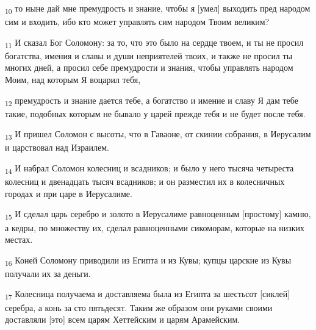 \begin{tcolorbox}
\textsubscript{10} то ныне дай мне премудрость и знание, чтобы я [умел] выходить пред народом сим и входить, ибо кто может управлять сим народом Твоим великим?
\end{tcolorbox}
\begin{tcolorbox}
\textsubscript{11} И сказал Бог Соломону: за то, что это было на сердце твоем, и ты не просил богатства, имения и славы и души неприятелей твоих, и также не просил ты многих дней, а просил себе премудрости и знания, чтобы управлять народом Моим, над которым Я воцарил тебя,
\end{tcolorbox}
\begin{tcolorbox}
\textsubscript{12} премудрость и знание дается тебе, а богатство и имение и славу Я дам тебе такие, подобных которым не бывало у царей прежде тебя и не будет после тебя.
\end{tcolorbox}
\begin{tcolorbox}
\textsubscript{13} И пришел Соломон с высоты, что в Гаваоне, от скинии собрания, в Иерусалим и царствовал над Израилем.
\end{tcolorbox}
\begin{tcolorbox}
\textsubscript{14} И набрал Соломон колесниц и всадников; и было у него тысяча четыреста колесниц и двенадцать тысяч всадников; и он разместил их в колесничных городах и при царе в Иерусалиме.
\end{tcolorbox}
\begin{tcolorbox}
\textsubscript{15} И сделал царь серебро и золото в Иерусалиме равноценным [простому] камню, а кедры, по множеству их, сделал равноценными сикоморам, которые на низких местах.
\end{tcolorbox}
\begin{tcolorbox}
\textsubscript{16} Коней Соломону приводили из Египта и из Кувы; купцы царские из Кувы получали их за деньги.
\end{tcolorbox}
\begin{tcolorbox}
\textsubscript{17} Колесница получаема и доставляема была из Египта за шестьсот [сиклей] серебра, а конь за сто пятьдесят. Таким же образом они руками своими доставляли [это] всем царям Хеттейским и царям Арамейским.
\end{tcolorbox}
